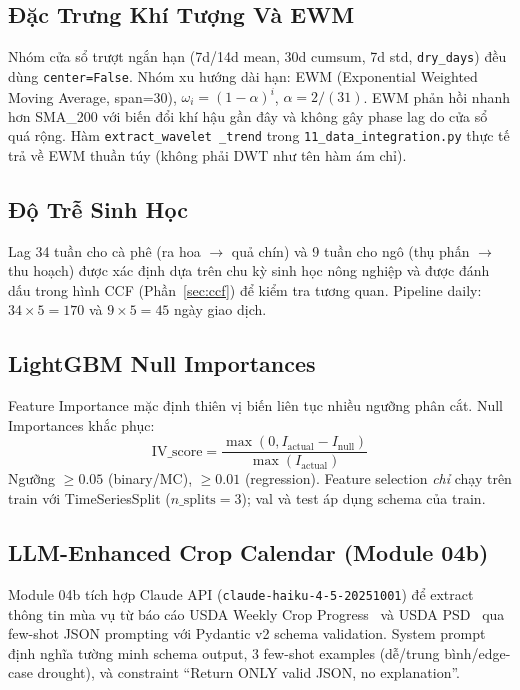 \documentclass[conference]{IEEEtran}
\begin{document}
\subsection{Đặc Trưng Khí Tượng Và EWM}

Nhóm cửa sổ trượt ngắn hạn (7d/14d mean, 30d cumsum, 7d std,
\texttt{dry\_days}) đều dùng \texttt{center=False}. Nhóm xu hướng dài hạn:
EWM (Exponential Weighted Moving Average, span=30), $\omega_i = (1-\alpha)^i$,
$\alpha = 2/(31)$. EWM phản hồi nhanh hơn SMA\_200 với biến đổi khí hậu gần
đây và không gây phase lag do cửa sổ quá rộng. Hàm \texttt{extract\_wavelet%
\_trend} trong \texttt{11\_data\_integration.py} thực tế trả về EWM thuần
túy (không phải DWT như tên hàm ám chỉ).

\subsection{Độ Trễ Sinh Học}

Lag 34 tuần cho cà phê (ra hoa $\rightarrow$ quả chín) và 9 tuần cho ngô
(thụ phấn $\rightarrow$ thu hoạch) được xác định dựa trên chu kỳ sinh học
nông nghiệp và được đánh dấu trong hình CCF (Phần~\ref{sec:ccf}) để kiểm
tra tương quan.
Pipeline daily: $34 \times 5 = 170$ và $9 \times 5 = 45$ ngày giao dịch.

\subsection{LightGBM Null Importances}

Feature Importance mặc định thiên vị biến liên tục nhiều ngưỡng phân cắt.
Null Importances khắc phục:
\begin{equation}
\text{IV\_score} = \frac{\max(0, I_\text{actual} - I_\text{null})}
                       {\max(I_\text{actual})}
\end{equation}
Ngưỡng $\geq 0.05$ (binary/MC), $\geq 0.01$ (regression). Feature selection
\emph{chỉ} chạy trên train với TimeSeriesSplit ($n\_\text{splits}=3$); val và
test áp dụng schema của train.

\subsection{LLM-Enhanced Crop Calendar (Module 04b)}

Module 04b tích hợp Claude API (\texttt{claude-haiku-4-5-20251001}) để extract
thông tin mùa vụ từ báo cáo USDA Weekly Crop Progress~\cite{usda_nass} và
USDA PSD~\cite{usda_fas} qua few-shot JSON prompting với Pydantic v2 schema
validation. System prompt định nghĩa tường minh schema output, 3 few-shot
examples (dễ/trung bình/edge-case drought), và constraint ``Return ONLY valid
JSON, no explanation''.
\end{document}
